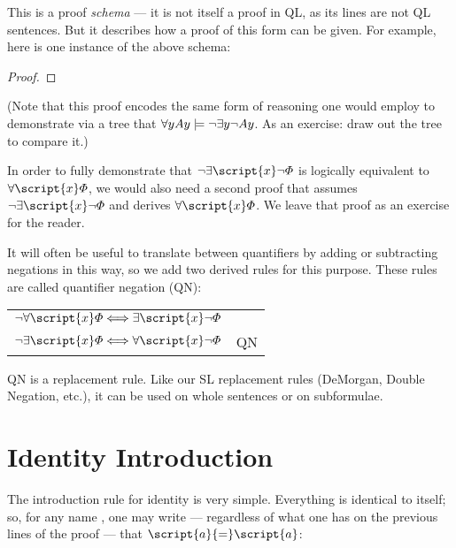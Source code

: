 This is a proof \emph{schema} --- it is not itself a proof in QL, as its lines are not QL sentences. But it describes how a proof of this form can be given. For example, here is one instance of the above schema:


\begin{proof}
	 
	\open
		\open
			\open
			\close
		\close
	\close
\end{proof}

(Note that this proof encodes the same form of reasoning one would employ to demonstrate via a tree that $\forall y Ay \models \neg \exists y \neg Ay$. As an exercise: draw out the tree to compare it.)

In order to fully demonstrate that $\enot\exists \script{x}\enot\metaA{}$ is logically equivalent to $\forall \script{x}\metaA{}$, we would also need a second proof that assumes $\enot\exists \script{x}\enot\metaA{}$ and derives $\forall \script{x}\metaA{}$. We leave that proof as an exercise for the reader.

It will often be useful to translate between quantifiers by adding or subtracting negations in this way, so we add two derived rules for this purpose. These rules are called quantifier negation (QN):
\begin{center}
\begin{tabular}{rl}
$\enot\forall\script{x}\metaA{} \Longleftrightarrow \exists\script{x}\enot\metaA{}$\\
$\enot\exists\script{x}\metaA{} \Longleftrightarrow \forall\script{x}\enot\metaA{}$
& QN
\end{tabular}
\end{center}
QN is a replacement rule. Like our SL replacement rules (DeMorgan, Double Negation, etc.), it can be used on whole sentences or on subformulae.

\section{Identity Introduction}

The introduction rule for identity is very simple. Everything is identical to itself; so, for any name , one may write --- regardless of what one has on the previous lines of the proof --- that $\script{a}{=}\script{a}$:


